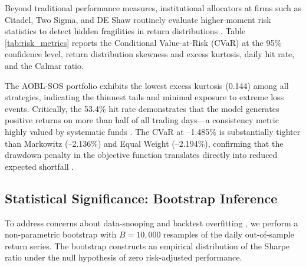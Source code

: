 \documentclass[11pt,a4paper]{article}
\begin{document}
Beyond traditional performance measures, institutional allocators at firms such as Citadel, Two Sigma, and DE Shaw routinely evaluate higher-moment risk statistics to detect hidden fragilities in return distributions \cite{ang2006}. Table \ref{tab:risk_metrics} reports the Conditional Value-at-Risk (CVaR) at the 95\% confidence level, return distribution skewness and excess kurtosis, daily hit rate, and the Calmar ratio.

\begin{table}[htbp]
\centering
\caption{Institutional Tail-Risk Metrics (10 bps Cost, Monthly Rebalancing, 2023-2025)}
\label{tab:risk_metrics}
\end{table}

The AOBL-SOS portfolio exhibits the lowest excess kurtosis (0.144) among all strategies, indicating the thinnest tails and minimal exposure to extreme loss events. Critically, the 53.4\% hit rate demonstrates that the model generates positive returns on more than half of all trading days—a consistency metric highly valued by systematic funds \cite{grinold1999}. The CVaR at --1.485\% is substantially tighter than Markowitz (--2.136\%) and Equal Weight (--2.194\%), confirming that the drawdown penalty in the objective function translates directly into reduced expected shortfall \cite{rockafellar2000}.

\subsection{Statistical Significance: Bootstrap Inference}
To address concerns about data-snooping and backtest overfitting \cite{bailey2014, harvey2016}, we perform a non-parametric bootstrap with $B = 10{,}000$ resamples of the daily out-of-sample return series. The bootstrap constructs an empirical distribution of the Sharpe ratio under the null hypothesis of zero risk-adjusted performance.
\end{document}
